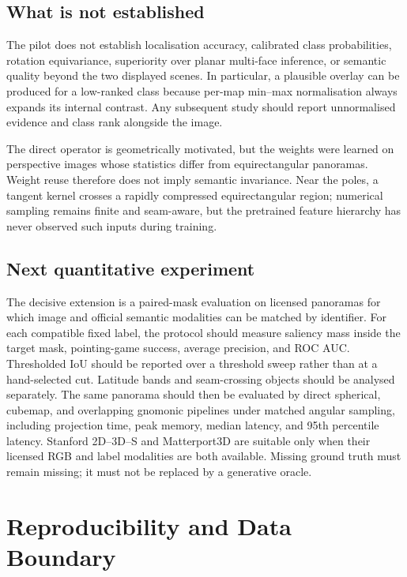 \documentclass{isprs}
\begin{document}
\subsection{What is not established}

The pilot does not establish localisation accuracy, calibrated class
probabilities, rotation equivariance, superiority over planar multi-face
inference, or semantic quality beyond the two displayed scenes.  In particular,
a plausible overlay can be produced for a low-ranked class because per-map
min--max normalisation always expands its internal contrast.  Any subsequent
study should report unnormalised evidence and class rank alongside the image.

The direct operator is geometrically motivated, but the weights were learned
on perspective images whose statistics differ from equirectangular panoramas.
Weight reuse therefore does not imply semantic invariance.  Near the poles, a
tangent kernel crosses a rapidly compressed equirectangular region; numerical
sampling remains finite and seam-aware, but the pretrained feature hierarchy
has never observed such inputs during training.

\subsection{Next quantitative experiment}

The decisive extension is a paired-mask evaluation on licensed panoramas for
which image and official semantic modalities can be matched by identifier.
For each compatible fixed label, the protocol should measure saliency mass
inside the target mask, pointing-game success, average precision, and ROC AUC.
Thresholded IoU should be reported over a threshold sweep rather than at a
hand-selected cut.  Latitude bands and seam-crossing objects should be analysed
separately.  The same panorama should then be evaluated by direct spherical,
cubemap, and overlapping gnomonic pipelines under matched angular sampling,
including projection time, peak memory, median latency, and 95th percentile
latency.  Stanford 2D--3D--S \cite{armeni2016stanford} and Matterport3D
\cite{chang2017matterport} are suitable only when their licensed RGB and label
modalities are both available.  Missing ground truth must remain missing; it
must not be replaced by a generative oracle.

\section{Reproducibility and Data Boundary}
\end{document}
